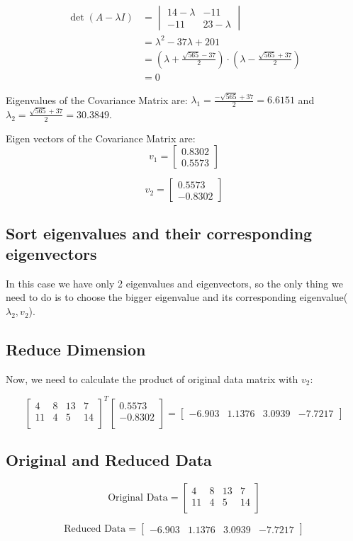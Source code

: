 \documentclass{article}
\begin{document}
\begin{align*}
\det(A - \lambda I) &= \begin{vmatrix}
    14 - \lambda & -11 \\
    -11 & 23 - \lambda
\end{vmatrix} \\
&= \lambda^2 - 37\lambda + 201 \\
&= (\lambda + \frac{\sqrt{565} - 37}{2}) \cdot (\lambda - \frac{\sqrt{565} + 37}{2}) \\
&= 0
\end{align*}

Eigenvalues of the Covariance Matrix are: \(\lambda_1 = \frac{-\sqrt{565} + 37}{2} = 6.6151\) and \(\lambda_2 = \frac{\sqrt{565} + 37}{2} = 30.3849\).

Eigen vectors of the Covariance Matrix are:
\[v_1 = \begin{bmatrix}
    0.8302\\
    0.5573
\end{bmatrix}\]

\[v_2 = \begin{bmatrix}
    0.5573\\
    -0.8302
\end{bmatrix}\]

\bigskip
\bigskip

\subsection{Sort eigenvalues and their corresponding eigenvectors}
In this case we have only 2 eigenvalues and eigenvectors, so the only thing we need to do is to choose the bigger eigenvalue and its corresponding eigenvalue($\lambda_2, v_2$).

\pagebreak

\subsection{Reduce Dimension}
Now, we need to calculate the product of original data matrix with $v_2$:

\[
\begin{bmatrix}
    4 & 8 & 13 & 7 \\
    11 & 4 & 5 & 14 \\
\end{bmatrix}^T
\begin{bmatrix}
    0.5573\\
    -0.8302\\
\end{bmatrix}
=
\begin{bmatrix}
    -6.903 & 1.1376 & 3.0939 & -7.7217
\end{bmatrix}
\]

\bigskip
\bigskip

\subsection{Original and Reduced Data}
\[
\text{Original Data} =
\begin{bmatrix}
    4 & 8 & 13 & 7 \\
    11 & 4 & 5 & 14 \\
\end{bmatrix}
\]


\[
\text{Reduced Data} =
\begin{bmatrix}
    -6.903 & 1.1376 & 3.0939 & -7.7217
\end{bmatrix}
\]
\end{document}

